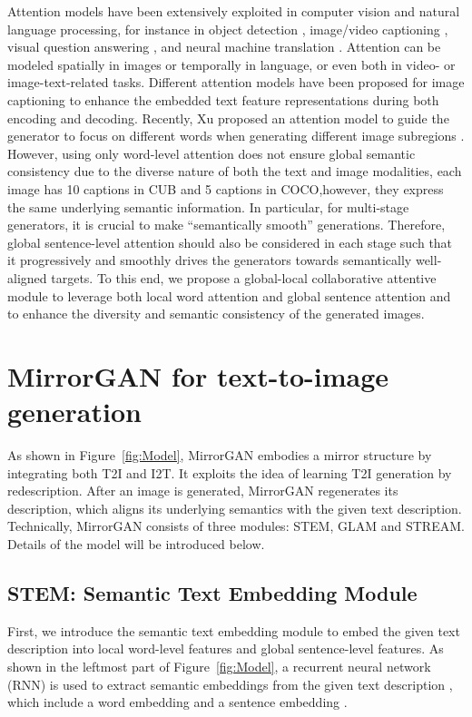 \documentclass[10pt,twocolumn,letterpaper]{article}
\begin{document}
Attention models have been extensively exploited in computer vision and natural language processing, for instance in object detection \cite{oliva2003top,deubel1996saccade,Liu2018DecideNet,Zhang2018ObjectDetection}, image/video captioning \cite{xu2015show,gao2017video,Wang2018Captioning}, visual question answering \cite{anderson2017bottom,xu2016ask,yang2016stacked,qiao2018exploring}, and neural machine translation \cite{luong2015effective,firat2016multi}. Attention can be modeled spatially in images or temporally in language, or even both in video- or image-text-related tasks. Different attention models have been proposed for image captioning to enhance the embedded text feature representations during both encoding and decoding. Recently, Xu \etal proposed an attention model to guide the generator to focus on different words when generating different image subregions \cite{xu2017attngan}. However, using only word-level attention does not ensure global semantic consistency due to the diverse nature of both the text and image modalities,  each image has 10 captions in CUB and 5 captions in COCO,however, they express the same underlying semantic information. In particular, for multi-stage generators, it is crucial to make ``semantically smooth'' generations. Therefore, global sentence-level attention should also be considered in each stage such that it progressively and smoothly drives the generators towards semantically well-aligned targets. To this end, we propose a global-local collaborative attentive module to leverage both local word attention and global sentence attention and to enhance the diversity and semantic consistency of the generated images. 

\section{MirrorGAN for text-to-image generation}
As shown in Figure~\ref{fig:Model}, MirrorGAN embodies a mirror structure by integrating both T2I and I2T. It exploits the idea of learning T2I generation by redescription. After an image is generated, MirrorGAN regenerates its description, which aligns its underlying semantics with the given text description. Technically, MirrorGAN consists of three modules: STEM, GLAM and STREAM. Details of the model will be introduced below.

\subsection{STEM: Semantic Text Embedding Module}
First, we introduce the semantic text embedding module to embed the given text description into local word-level features and global sentence-level features. As shown in the leftmost part of Figure~\ref{fig:Model}, a recurrent neural network (RNN) \cite{cho2014learning} is used to extract semantic embeddings from the given text description , which include a word embedding  and a sentence embedding . 
\end{document}
